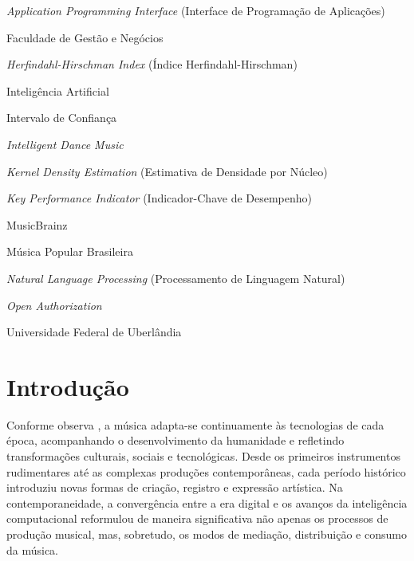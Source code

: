 \documentclass[12pt, %
openright,
oneside, %
a4paper,    %
english,   %
brazil]{facom-ufu-abntex2}
\begin{document}
\listoftables*
\cleardoublepage

\begin{siglas}
  \item[API] \emph{Application Programming Interface} (Interface de Programação de Aplicações)
  \item[FAGEN] Faculdade de Gestão e Negócios
  \item[HHI] \emph{Herfindahl-Hirschman Index} (Índice Herfindahl-Hirschman)
  \item[IA] Inteligência Artificial
  \item[IC] Intervalo de Confiança
  \item[IDM] \emph{Intelligent Dance Music}
  \item[KDE] \emph{Kernel Density Estimation} (Estimativa de Densidade por Núcleo)
  \item[KPI] \emph{Key Performance Indicator} (Indicador-Chave de Desempenho)
  \item[MB] MusicBrainz
  \item[MPB] Música Popular Brasileira
  \item[NLP] \emph{Natural Language Processing} (Processamento de Linguagem Natural)
  \item[OAuth] \emph{Open Authorization}
  \item[UFU] Universidade Federal de Uberlândia
\end{siglas}

\tableofcontents*
\cleardoublepage

\textual

\chapter{Introdução}

Conforme observa , a música adapta-se
continuamente às tecnologias de cada época, acompanhando o desenvolvimento da
humanidade e refletindo transformações culturais, sociais e tecnológicas. Desde
os primeiros instrumentos rudimentares até as complexas produções
contemporâneas, cada período histórico introduziu novas formas de criação,
registro e expressão artística. Na contemporaneidade, a convergência entre a era
digital e os avanços da inteligência computacional reformulou de maneira
significativa não apenas os processos de produção musical, mas, sobretudo, os
modos de mediação, distribuição e consumo da música.
\end{document}
